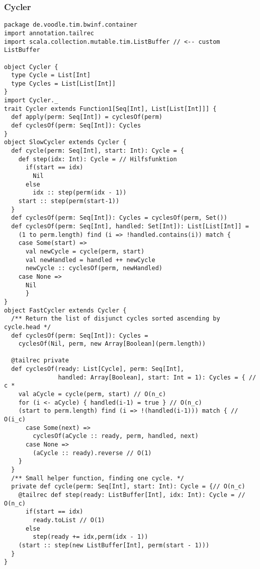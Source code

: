\subsubsection{Cycler}
\lstset{basicstyle=\ttfamily\scriptsize}
\begin{lstlisting}
package de.voodle.tim.bwinf.container
import annotation.tailrec
import scala.collection.mutable.tim.ListBuffer // <-- custom ListBuffer

object Cycler {
  type Cycle = List[Int]
  type Cycles = List[List[Int]]
}
import Cycler._
trait Cycler extends Function1[Seq[Int], List[List[Int]]] {
  def apply(perm: Seq[Int]) = cyclesOf(perm)
  def cyclesOf(perm: Seq[Int]): Cycles
}
object SlowCycler extends Cycler {
  def cycle(perm: Seq[Int], start: Int): Cycle = {
    def step(idx: Int): Cycle = // Hilfsfunktion
      if(start == idx)
        Nil
      else
        idx :: step(perm(idx - 1))
    start :: step(perm(start-1))
  }
  def cyclesOf(perm: Seq[Int]): Cycles = cyclesOf(perm, Set())
  def cyclesOf(perm: Seq[Int], handled: Set[Int]): List[List[Int]] =
    (1 to perm.length) find (i => !handled.contains(i)) match {
	case Some(start) =>
	  val newCycle = cycle(perm, start)
	  val newHandled = handled ++ newCycle
	  newCycle :: cyclesOf(perm, newHandled)
	case None =>
	  Nil
      }
}
object FastCycler extends Cycler {
  /** Return the list of disjunct cycles sorted ascending by cycle.head */
  def cyclesOf(perm: Seq[Int]): Cycles =
    cyclesOf(Nil, perm, new Array[Boolean](perm.length))

  @tailrec private
  def cyclesOf(ready: List[Cycle], perm: Seq[Int],
               handled: Array[Boolean], start: Int = 1): Cycles = { // c *
    val aCycle = cycle(perm, start) // O(n_c)
    for (i <- aCycle) { handled(i-1) = true } // O(n_c)
    (start to perm.length) find (i => !(handled(i-1))) match { // O(i_c)
      case Some(next) =>
        cyclesOf(aCycle :: ready, perm, handled, next)
      case None =>
        (aCycle :: ready).reverse // O(1)
    }
  }
  /** Small helper function, finding one cycle. */
  private def cycle(perm: Seq[Int], start: Int): Cycle = {// O(n_c)
    @tailrec def step(ready: ListBuffer[Int], idx: Int): Cycle = // O(n_c)
      if(start == idx)
        ready.toList // O(1)
      else
        step(ready += idx,perm(idx - 1))
    (start :: step(new ListBuffer[Int], perm(start - 1)))
  }
}
\end{lstlisting}

